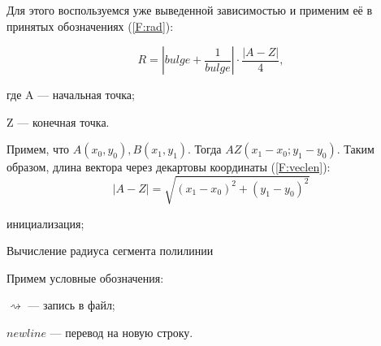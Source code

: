 Для этого воспользуемся уже выведенной зависимостью \cite{ukoloff} и применим её в принятых обозначениях (\ref{F:rad}):

\begin{equation}
	R=|bulge+\frac{1}{bulge}|\cdot\frac{|A-Z|}{4},
	\label{F:rad}
\end{equation}

где A --- начальная точка;

Z --- конечная точка.

Примем, что $A(x_0,y_0), B(x_1,y_1)$. Тогда $AZ(x_1-x_0; y_1-y_0)$.
Таким образом, длина вектора через декартовы координаты (\ref{F:veclen}):
\begin{equation}
	|A-Z|=\sqrt{(x_1-x_0)^2+(y_1-y_0)^2}
	\label{F:veclen}
\end{equation}


\begin{algorithm}[H]
	\SetAlgoLined
	инициализация;
	
	
	\caption{Вычисление радиуса сегмента полилинии}
	\label{alg:polyarcrad}
\end{algorithm}

Примем условные обозначения:

$\rightsquigarrow$ --- запись в файл;

$newline$ --- перевод на новую строку.

